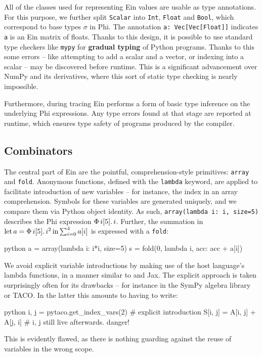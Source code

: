 All of the classes used for representing Ein values are usable as type annotations. For this purpose, we further split \texttt{Scalar} into \texttt{Int}, \texttt{Float} and \texttt{Bool}, which correspond to base types $\sigma$ in Phi. The annotation \texttt{a: Vec[Vec[Float]]} indicates \texttt{a} is an Ein matrix of floats. Thanks to this design, it is possible to use standard type checkers like \texttt{mypy} for \textbf{gradual typing} of Python programs. Thanks to this some errors -- like attempting to add a scalar and a vector, or indexing into a scalar -- may be discovered before runtime. This is a significant advancement over NumPy and its derivatives, where this sort of static type checking is nearly impossible.

Furthermore, during tracing Ein performs a form of basic type inference on the underlying Phi expressions. Any type errors found at that stage are reported at runtime, which ensures type safety of programs produced by the compiler. 

\subsection{Combinators}

The central part of Ein are the pointful, comprehension-style primitives: \texttt{array} and \texttt{fold}. Anonymous functions, defined with the \texttt{lambda} keyword, are applied to facilitate introduction of new variables -- for instance, the index in an array comprehension. Symbols for these variables are generated uniquely, and we compare them via Python object identity. As such, \texttt{array(lambda i: i, size=5)} describes the Phi expression $\Phi\, {i}[{5}] \ldotp {i}$. Further, the summation in $\mathrm{let}\,{a}={\Phi\, {i}[{5}] \ldotp {i^2}}\,\mathrm{in}\,{ \sum_{i=0}^{4} a[i]}$ is expressed with a \texttt{fold}:
\begin{center}
\begin{cminted}{python}
a = array(lambda i: i*i, size=5)
s = fold(0, lambda i, acc: acc + a[i])
\end{cminted}
\end{center}
We avoid explicit variable introductions by making use of the host language's lambda functions, in a manner similar to \textcite{atkey2009unembedding} and Jax. The explicit approach is taken surprisingly often for its drawbacks -- for instance in the SymPy algebra library or TACO. In the latter this amounts to having to write:
\begin{center}
\begin{cminted}{python}
i, j = pytaco.get_index_vars(2)  # explicit introduction
S[i, j] = A[i, j] + A[j, i]      # i, j still live afterwards. danger!
\end{cminted}
\end{center}
This is evidently flawed, as there is nothing guarding against the reuse of variables in the wrong scope. 

